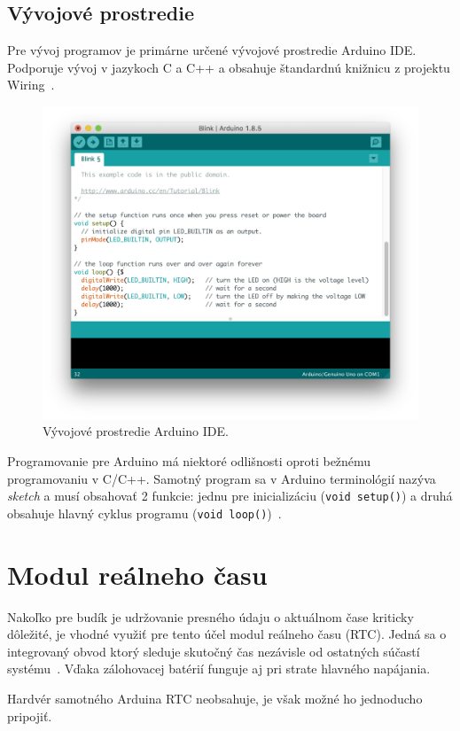 \subsection{Vývojové prostredie}
Pre vývoj programov je primárne určené vývojové prostredie Arduino IDE. Podporuje vývoj v jazykoch C a C++ a obsahuje štandardnú knižnicu z projektu Wiring~\cite{maly-hvj}.

\begin{figure}
    \centering
    \includegraphics[width=\textwidth]{img/Arduino_IDE.png}
    \caption{Vývojové prostredie Arduino IDE.}
\end{figure}

Programovanie pre Arduino má niektoré odlišnosti oproti bežnému programovaniu v C/C++. Samotný program sa v Arduino terminológií nazýva \emph{sketch} a musí obsahovať 2 funkcie: jednu pre inicializáciu (\texttt{void setup()}) a druhá obsahuje hlavný cyklus programu (\texttt{void loop()})~\cite{maly-hvj}.

\section{Modul reálneho času}
Nakoľko pre budík je udržovanie presného údaju o aktuálnom čase kriticky dôležité, je vhodné využiť pre tento účel modul reálneho času (RTC). Jedná sa o integrovaný obvod ktorý sleduje skutočný čas nezávisle od ostatných súčastí systému~\cite{rtc-adafruit}. Vďaka zálohovacej batérií funguje aj pri strate hlavného napájania.

Hardvér samotného Arduina RTC neobsahuje, je však možné ho jednoducho pripojiť.
